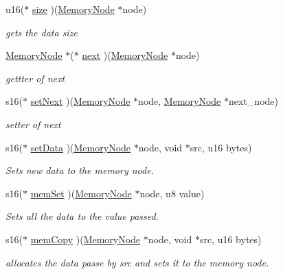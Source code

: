 \begin{DoxyCompactItemize}
u16($\ast$ \hyperlink{structmemory__node__ops__s_aac6e0ccb9192cefc1fc6ec9826a11f90}{size} )(\hyperlink{structmemory__node__s}{Memory\+Node} $\ast$node)
\begin{DoxyCompactList}\small\item\em gets the data size \end{DoxyCompactList}\item 
\hyperlink{structmemory__node__s}{Memory\+Node} $\ast$($\ast$ \hyperlink{structmemory__node__ops__s_a87ce72f198cd7c9df08a90d9cebbdde9}{next} )(\hyperlink{structmemory__node__s}{Memory\+Node} $\ast$node)
\begin{DoxyCompactList}\small\item\em gettter of next \end{DoxyCompactList}\item 
s16($\ast$ \hyperlink{structmemory__node__ops__s_ab2ec1c03766f20d2d69c37e658c0e4b2}{set\+Next} )(\hyperlink{structmemory__node__s}{Memory\+Node} $\ast$node, \hyperlink{structmemory__node__s}{Memory\+Node} $\ast$next\+\_\+node)
\begin{DoxyCompactList}\small\item\em setter of next \end{DoxyCompactList}\item 
s16($\ast$ \hyperlink{structmemory__node__ops__s_a7b21a53d026216de8e44299e4b6191fb}{set\+Data} )(\hyperlink{structmemory__node__s}{Memory\+Node} $\ast$node, void $\ast$src, u16 bytes)
\begin{DoxyCompactList}\small\item\em Sets new data to the memory node. \end{DoxyCompactList}\item 
s16($\ast$ \hyperlink{structmemory__node__ops__s_a25eeed1bed000ce61e20eb1889710be1}{mem\+Set} )(\hyperlink{structmemory__node__s}{Memory\+Node} $\ast$node, u8 value)
\begin{DoxyCompactList}\small\item\em Sets all the data to the value passed. \end{DoxyCompactList}\item 
s16($\ast$ \hyperlink{structmemory__node__ops__s_a6e6960186601b2a4dcfec2a33438b15b}{mem\+Copy} )(\hyperlink{structmemory__node__s}{Memory\+Node} $\ast$node, void $\ast$src, u16 bytes)
\begin{DoxyCompactList}\small\item\em allocates the data passe by src and sets it to the memory node. \end{DoxyCompactList}\item 

\end{DoxyCompactItemize}
